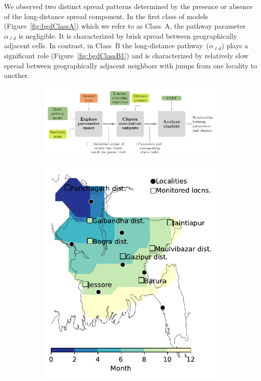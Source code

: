 \documentclass[11pt]{article}
\newcommand{\asd}{\alpha_s}
\newcommand{\afm}{\alpha_{\ell}}
\newcommand{\ald}{\alpha_{\ell d}}
\newcommand{\mooreRange}{r_\mathrm{M}}
\theoremstyle{definition}
\begin{document}
We observed two distinct spread patterns determined by the presence or
absence of the long-distance spread component. In the first class of models
(Figure~\ref{fig:bgdClassA}) which we refer to as Class~A, the pathway
parameter~$\ald$ is negligible. It is characterized by brisk spread between
geographically adjacent cells.
In contrast, in Class~B the long-distance pathway~($\ald$) plays a
significant role (Figure~\ref{fig:bgdClassB1}) and is characterized by
relatively slow spread between geographically adjacent neighbors with jumps
from one locality to another.
\begin{figure}[!ht]
    \centering
\begin{subfigure}[b]{.8\textwidth}
    \includegraphics[width=\textwidth]{figs/spread_analysis.pdf}
    \caption{\label{fig:clusterOutline}}
\end{subfigure}
\begin{subfigure}[b]{.4\textwidth}
    \includegraphics[width=\textwidth]{../cellular_automata/results/contour/BGD_model-A.pdf}

\end{subfigure}
\end{figure}
\end{document}
